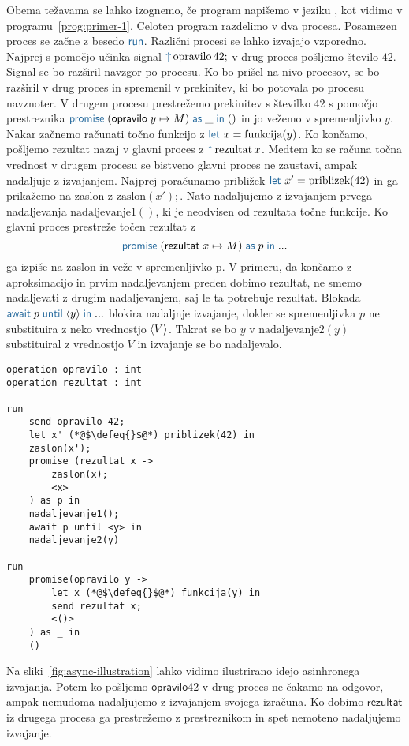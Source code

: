 Obema težavama se lahko izognemo, če program napišemo v jeziku \aeff, kot vidimo v programu~\ref{prog:primer-1}. Celoten program razdelimo v dva procesa. Posamezen proces se začne z besedo $\tmkw{run}$. Različni procesi se lahko izvajajo vzporedno.
Najprej s pomočjo učinka signal $\tmkw{\uparrow}\, \text{opravilo}\,42;$ v drug proces pošljemo število $42$. Signal se bo razširil navzgor po procesu. Ko bo prišel na nivo procesov, se bo razširil v drug proces in spremenil v prekinitev, ki bo potovala po procesu navznoter. V drugem procesu prestrežemo prekinitev s številko $42$ s pomočjo prestreznika $\tmwith{opravilo}{y}{M}{\_}{()}$ in jo vežemo v spremenljivko $y$. Nakar začnemo računati točno funkcijo z $\tmkw{let}\ x = \text{funkcija}(y)$. Ko končamo, pošljemo rezultat nazaj v glavni proces z $\tmkw{\uparrow}\, \text{rezultat}\,x$.
Medtem ko se računa točna vrednost v drugem procesu se bistveno glavni proces ne zaustavi, ampak nadaljuje z izvajanjem. Najprej poračunamo približek $\tmkw{let}\ x' = \text{priblizek}(42)$ in ga prikažemo na zaslon z $\text{zaslon}(x');$. Nato nadaljujemo z izvajanjem prvega nadaljevanja $\text{nadaljevanje}1()$, ki je neodvisen od rezultata točne funkcije. Ko glavni proces prestreže točen rezultat z $$\tmwith{rezultat}{x}{M}{p}{...}$$ ga izpiše na zaslon in veže v spremenljivko p. V primeru, da končamo z aproksimacijo in prvim nadaljevanjem preden dobimo rezultat, ne smemo nadaljevati z drugim nadaljevanjem, saj le ta potrebuje rezultat. Blokada $\tmawait{p}{y}{...}$ blokira nadaljnje izvajanje, dokler se spremenljivka $p$ ne substituira z neko vrednostjo $\langle V \rangle$. Takrat se bo $y$ v $\text{nadaljevanje}2(y)$ substituiral z vrednostjo $V$ in izvajanje se bo nadaljevalo.

\begin{lstlisting}[caption={Asinhron vzporeden primer.},label={prog:primer-1},float,floatplacement=H]
operation opravilo : int
operation rezultat : int

run 
	send opravilo 42;
	let x' (*@$\defeq{}$@*) priblizek(42) in
	zaslon(x');
	promise (rezultat x ->
	   	zaslon(x);
	   	<x>
	) as p in
	nadaljevanje1();
	await p until <y> in
	nadaljevanje2(y)

run 
	promise(opravilo y ->
	   	let x (*@$\defeq{}$@*) funkcija(y) in
	   	send rezultat x;
	   	<()>
	) as _ in
	()
\end{lstlisting}

Na sliki~\ref{fig:async-illustration} lahko vidimo ilustrirano idejo asinhronega izvajanja. Potem ko pošljemo $\mathsf{opravilo} 42$ v drug proces ne čakamo na odgovor, ampak nemudoma nadaljujemo z izvajanjem svojega izračuna. Ko dobimo $\mathsf{rezultat}$ iz drugega procesa ga prestrežemo z prestreznikom in spet nemoteno nadaljujemo izvajanje.

